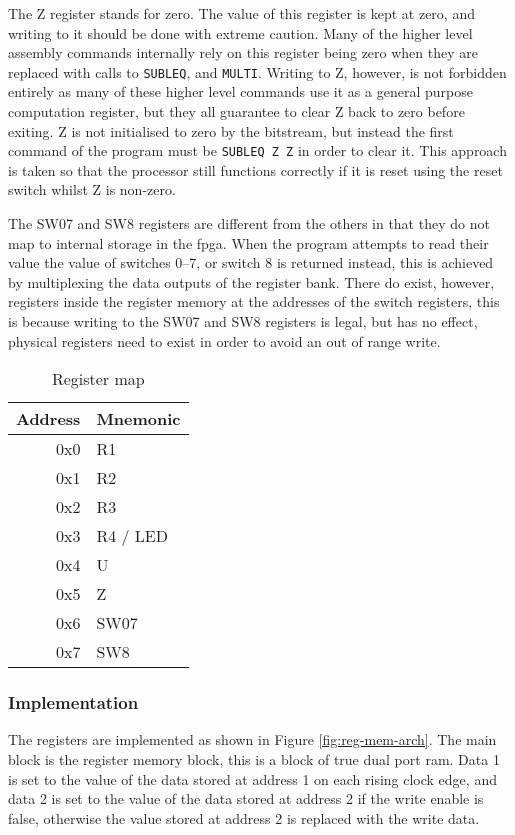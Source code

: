 The Z register stands for zero. The value of this register is kept at zero, and writing to it should be done with extreme caution. Many of the higher level assembly commands internally rely on this register being zero when they are replaced with calls to \texttt{SUBLEQ}, and \texttt{MULTI}. Writing to Z, however, is not forbidden entirely as many of these higher level commands use it as a general purpose computation register, but they all guarantee to clear Z back to zero before exiting. Z is not initialised to zero by the bitstream, but instead the first command of the program must be \texttt{SUBLEQ Z Z} in order to clear it. This approach is taken so that the processor still functions correctly if it is reset using the reset switch whilst Z is non-zero.

The SW07 and SW8 registers are different from the others in that they do not map to internal storage in the \gls{fpga}. When the program attempts to read their value the value of switches 0--7, or switch 8 is returned instead, this is achieved by multiplexing the data outputs of the register bank. There do exist, however, registers inside the register memory at the addresses of the switch registers, this is because writing to the SW07 and SW8 registers is legal, but has no effect, physical registers need to exist in order to avoid an out of range write.


\begin{table}[ht]
	\centering
	\caption{Register map}
	\label{tbl:reg-map}
	\begin{tabular}{r | l}
		\toprule
		Address & Mnemonic \\
		\midrule
		0x0	& R1 \\
		0x1	& R2 \\
		0x2	& R3 \\
		0x3	& R4 / LED \\
		0x4	& U \\
		0x5	& Z \\
		0x6	& SW07 \\
		0x7	& SW8 \\
		\bottomrule
	\end{tabular}
\end{table}

\subsubsection{Implementation}
The registers are implemented as shown in Figure \ref{fig:reg-mem-arch}. The main block is the register memory block, this is a block of true dual port \gls{ram}. Data 1 is set to the value of the data stored at address 1 on each rising clock edge, and data 2 is set to the value of the data stored at address 2 if the write enable is false, otherwise the value stored at address 2 is replaced with the write data.

